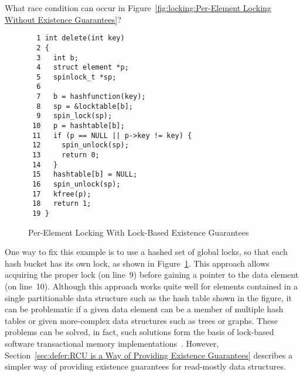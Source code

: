 \QuickQuiz{}
	What race condition can occur in
	Figure~\ref{fig:locking:Per-Element Locking Without Existence Guarantees}?
 \QuickQuizEnd

\begin{figure}[tbp]
{ \scriptsize
\begin{verbatim}
  1 int delete(int key)
  2 {
  3   int b;
  4   struct element *p;
  5   spinlock_t *sp;
  6
  7   b = hashfunction(key);
  8   sp = &locktable[b];
  9   spin_lock(sp);
 10   p = hashtable[b];
 11   if (p == NULL || p->key != key) {
 12     spin_unlock(sp);
 13     return 0;
 14   }
 15   hashtable[b] = NULL;
 16   spin_unlock(sp);
 17   kfree(p);
 18   return 1;
 19 }
\end{verbatim}
}
\caption{Per-Element Locking With Lock-Based Existence Guarantees}
\label{fig:locking:Per-Element Locking With Lock-Based Existence Guarantees}
\end{figure}

One way to fix this example is to use a hashed set of global locks, so
that each hash bucket has its own lock, as shown in
Figure~\ref{fig:locking:Per-Element Locking With Lock-Based Existence Guarantees}.
This approach allows acquiring the proper lock (on line~9) before
gaining a pointer to the data element (on line~10).
Although this approach works quite well for elements contained in a
single partitionable data structure such as the hash table shown in the
figure, it can be problematic if a given data element can be a member
of multiple hash tables or given more-complex data structures such
as trees or graphs.
These problems can be solved, in fact, such solutions form the basis
of lock-based software transactional memory
implementations~\cite{Shavit95,DaveDice2006DISC}.
However,
Section~\ref{sec:defer:RCU is a Way of Providing Existence Guarantees}
describes a simpler way of providing existence guarantees for read-mostly
data structures.
